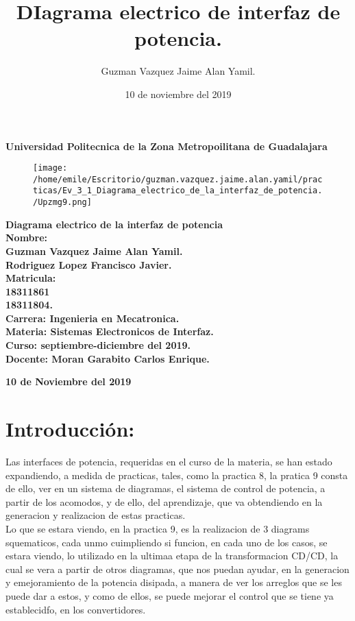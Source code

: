 \documentclass[11pt]{article}
\title{\textbf{DIagrama electrico de interfaz de potencia. }}
\author{Guzman Vazquez Jaime Alan Yamil.}
\date{10 de noviembre del 2019}
\begin{document}
\begin{center}
\LARGE \textbf{Universidad Politecnica de la Zona Metropoilitana de Guadalajara\\}


\begin{figure}[htp]
\centering
\texttt{[image: /home/emile/Escritorio/guzman.vazquez.jaime.alan.yamil/practicas/Ev\_3\_1\_Diagrama\_electrico\_de\_la\_interfaz\_de\_potencia./Upzmg9.png]}
\caption{}
\label{}
\end{figure}

\large \textbf{Diagrama electrico de la interfaz de potencia}\\
\vspace{0.1cm}
\large \textbf{Nombre: \\Guzman Vazquez Jaime Alan Yamil.\\Rodriguez Lopez Francisco Javier.\\
\vspace{0.1cm} Matricula:\\18311861\\18311804.\\
\vspace{0.1cm} Carrera: Ingenieria en Mecatronica.\\
\vspace{0.1cm} Materia: Sistemas Electronicos de Interfaz.\\
\vspace{0.1cm} Curso: septiembre-diciembre del 2019.\\
\vspace{0.1cm} Docente: Moran Garabito Carlos Enrique.}


\vspace{0.5cm}
\small \textbf{10 de Noviembre del 2019}
\end{center}

\section{Introducción:}

Las interfaces de potencia, requeridas en el curso de la materia, se han estado expandiendo, a medida de practicas, tales, como la practica 8, la pratica 9 consta de ello, ver en un sistema de diagramas, el sistema de control de potencia, a partir de los acomodos, y de ello, del aprendizaje, que va obtendiendo en la generacion y realizacion de estas practicas.\\

Lo que se estara viendo, en la practica 9, es la realizacion de 3 diagrams squematicos, cada unmo cuimpliendo si funcion, en cada uno de los casos, se estara viendo, lo utilizado en la ultimaa etapa de la transformacion CD/CD, la cual se vera a partir de otros diagramas, que nos puedan ayudar, en la generacion y emejoramiento de la potencia disipada, a manera de ver los arreglos que se les puede dar a estos, y como de ellos, se puede mejorar el control que se tiene ya establecidfo, en los convertidores.\\
\end{document}
